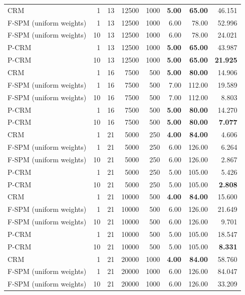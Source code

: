 \begin{tabular}{lrrrrrrr}
\midrule
CRM & 1 & 13 & 12500 & 1000 & \textbf{5.00} & \textbf{65.00} & 46.151 \\
F-SPM (uniform weights) & 1 & 13 & 12500 & 1000 & 6.00 & 78.00 & 52.996 \\
F-SPM (uniform weights) & 10 & 13 & 12500 & 1000 & 6.00 & 78.00 & 24.021 \\
P-CRM & 1 & 13 & 12500 & 1000 & \textbf{5.00} & \textbf{65.00} & 43.987 \\
P-CRM & 10 & 13 & 12500 & 1000 & \textbf{5.00} & \textbf{65.00} & \textbf{21.925} \\
\midrule
CRM & 1 & 16 & 7500 & 500 & \textbf{5.00} & \textbf{80.00} & 14.906 \\
F-SPM (uniform weights) & 1 & 16 & 7500 & 500 & 7.00 & 112.00 & 19.589 \\
F-SPM (uniform weights) & 10 & 16 & 7500 & 500 & 7.00 & 112.00 & 8.803 \\
P-CRM & 1 & 16 & 7500 & 500 & \textbf{5.00} & \textbf{80.00} & 14.270 \\
P-CRM & 10 & 16 & 7500 & 500 & \textbf{5.00} & \textbf{80.00} & \textbf{7.077} \\
\midrule
CRM & 1 & 21 & 5000 & 250 & \textbf{4.00} & \textbf{84.00} & 4.606 \\
F-SPM (uniform weights) & 1 & 21 & 5000 & 250 & 6.00 & 126.00 & 6.264 \\
F-SPM (uniform weights) & 10 & 21 & 5000 & 250 & 6.00 & 126.00 & 2.867 \\
P-CRM & 1 & 21 & 5000 & 250 & 5.00 & 105.00 & 5.426 \\
P-CRM & 10 & 21 & 5000 & 250 & 5.00 & 105.00 & \textbf{2.808} \\
\midrule
CRM & 1 & 21 & 10000 & 500 & \textbf{4.00} & \textbf{84.00} & 15.600 \\
F-SPM (uniform weights) & 1 & 21 & 10000 & 500 & 6.00 & 126.00 & 21.649 \\
F-SPM (uniform weights) & 10 & 21 & 10000 & 500 & 6.00 & 126.00 & 9.701 \\
P-CRM & 1 & 21 & 10000 & 500 & 5.00 & 105.00 & 18.547 \\
P-CRM & 10 & 21 & 10000 & 500 & 5.00 & 105.00 & \textbf{8.331} \\
\midrule
CRM & 1 & 21 & 20000 & 1000 & \textbf{4.00} & \textbf{84.00} & 58.760 \\
F-SPM (uniform weights) & 1 & 21 & 20000 & 1000 & 6.00 & 126.00 & 84.047 \\
F-SPM (uniform weights) & 10 & 21 & 20000 & 1000 & 6.00 & 126.00 & 33.209 \\

\end{tabular}

